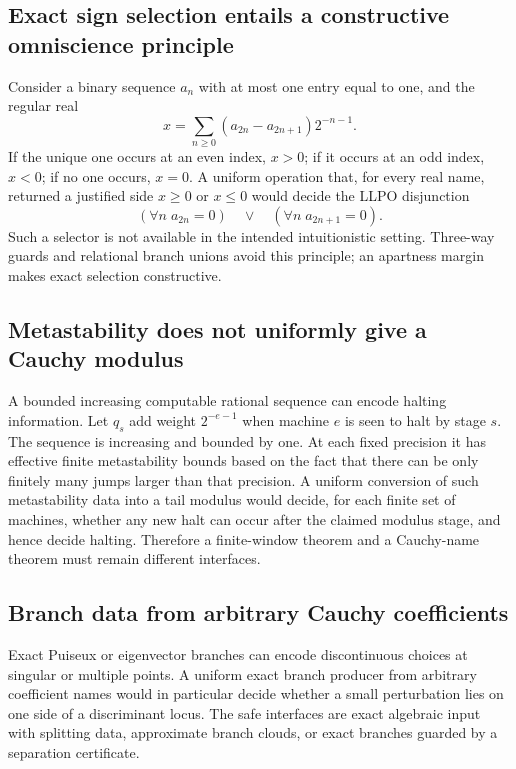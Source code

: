 \subsection{Exact sign selection entails a constructive omniscience principle}

Consider a binary sequence \(a_n\) with at most one entry equal to one, and the
regular real
\[
 x=\sum_{n\ge0}(a_{2n}-a_{2n+1})2^{-n-1}.
\]
If the unique one occurs at an even index, \(x>0\); if it occurs at an odd
index, \(x<0\); if no one occurs, \(x=0\).  A uniform operation that, for every
real name, returned a justified side \(x\ge0\) or \(x\le0\) would decide the
LLPO disjunction
\[
   (\forall n\;a_{2n}=0)\quad\vee\quad
   (\forall n\;a_{2n+1}=0).
\]
Such a selector is not available in the intended intuitionistic setting.
Three-way guards and relational branch unions avoid this principle; an
apartness margin makes exact selection constructive.

\subsection{Metastability does not uniformly give a Cauchy modulus}

A bounded increasing computable rational sequence can encode halting
information.  Let \(q_s\) add weight \(2^{-e-1}\) when machine \(e\) is seen to
halt by stage \(s\).  The sequence is increasing and bounded by one.  At each
fixed precision it has effective finite metastability bounds based on the fact
that there can be only finitely many jumps larger than that precision.  A
uniform conversion of such metastability data into a tail modulus would decide,
for each finite set of machines, whether any new halt can occur after the
claimed modulus stage, and hence decide halting.  Therefore a finite-window
theorem and a Cauchy-name theorem must remain different interfaces.

\subsection{Branch data from arbitrary Cauchy coefficients}

Exact Puiseux or eigenvector branches can encode discontinuous choices at
singular or multiple points.  A uniform exact branch producer from arbitrary
coefficient names would in particular decide whether a small perturbation lies
on one side of a discriminant locus.  The safe interfaces are exact algebraic
input with splitting data, approximate branch clouds, or exact branches guarded
by a separation certificate.

